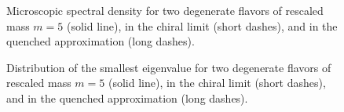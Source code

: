 \begin{figure}
  \centerline{}
  \caption{Microscopic spectral density for two
    degenerate flavors of rescaled mass $m=5$ (solid line), in the
    chiral limit (short dashes), and in the quenched
    approximation (long dashes).}
  \label{fig1}
\end{figure}

\begin{figure}[ht]
  \centerline{}
  \caption{Distribution of the smallest eigenvalue for two
    degenerate flavors of rescaled mass $m=5$ (solid line), in the
    chiral limit (short dashes), and in the quenched
    approximation (long dashes).}
  \label{fig2}
\end{figure}



